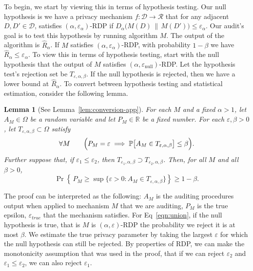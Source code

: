 \documentclass{article}
\theoremstyle{plain}
\newtheorem{lemma}[theorem]{Lemma}
\theoremstyle{definition}
\theoremstyle{remark}
\begin{document}
To begin, we start by viewing this in terms of hypothesis testing. Our null hypothesis is we have a privacy mechanism $f : \mathcal{D} \to \mathcal{R}$ that for any adjacent $D, D' \in \mathcal{D}$, satisfies $(\alpha, \varepsilon_\alpha)$-RDP if
\(
D_{\alpha} \big( M(D) \,\|\, M(D') \big) \leq \varepsilon_\alpha.
\)
Our audit's goal is to test this hypothesis by running algorithm $M$. The output of the algorithm is $\widehat R_\alpha$. If $M$ satisfies $(\alpha, \varepsilon_\alpha)$-RDP, with probability $1- \beta$ we have $\widehat R_\alpha \le \varepsilon_\alpha$. To view this in terms of hypothesis testing, start with the null hypothesis that the output of $M$ satisfies $(\alpha, \varepsilon_{\text{null}})$-RDP. Let the hypothesis test's rejection set be $T_{\varepsilon, \alpha, \beta}$. If the null hypothesis is rejected, then we have a lower bound at $\widehat R_\alpha$. To convert between hypothesis testing and statistical estimation, consider the following lemma.
\begin{lemma}[See Lemma~\ref{lem:conversion-app}]
\label{lem:conversion}
For each $M$ and a fixed $\alpha > 1$, let $A_M \in \Omega$ be a random variable and let $P_M \in \mathbb{R}$ be a fixed number.
For each $\varepsilon,\beta>0$, let $T_{\varepsilon,\alpha,\beta}\subset \Omega$ satisfy
\begin{equation}
\forall M\qquad
\Bigl(P_M=\varepsilon \;\Longrightarrow\; \mathbb{P}\bigl[A_M \in T_{\varepsilon,\alpha,\beta}\bigr]\le \beta\Bigr).
\end{equation}
Further suppose that, if $\varepsilon_1 \le \varepsilon_2$, then
$T_{\varepsilon_1,\alpha,\beta} \supset T_{\varepsilon_2,\alpha,\beta}$.
Then, for all $M$ and all $\beta>0$,
\begin{equation}
\Pr\!\left\{\,P_M \ge
\sup\{\varepsilon>0 : A_M \in T_{\varepsilon,\alpha,\beta}\}\right\}
\ge 1-\beta.
\end{equation}
\end{lemma}

The proof can be interpreted as the following: $A_M$ is the auditing procedures output when applied to mechanism $M$ that we are auditing, $P_M$ is the true epsilon, $\varepsilon_{true}$ that the mechanism satisfies. For Eq~\ref{eqn:union}, if the null hypothesis is true, that is $M$ is $(\alpha, \varepsilon)$-RDP the probability we reject it is at most $\beta$. We estimate the true privacy parameter by taking the largest $\varepsilon$ for which the null hypothesis can still be rejected. By properties of RDP, we can make the monotonicity assumption that was used in the proof, that if we can reject $\varepsilon_2$ and $\varepsilon_1 \le \varepsilon_2$, we can also reject $\varepsilon_1$.
\end{document}
